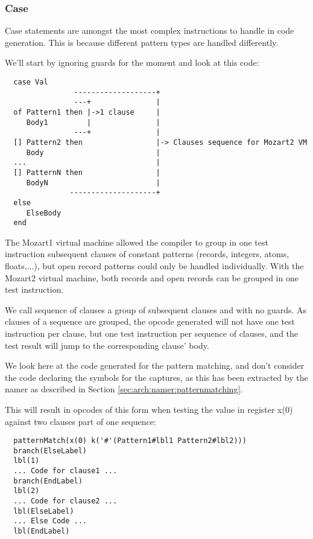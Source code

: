 \documentclass[a4paper]{memoir}
\begin{document}
\subsubsection{Case}\label{sec:arch:codegen:case}
Case statements are amongst the most complex instructions to handle in code generation. This is because different pattern types are handled differently. 


We'll start by ignoring guards for the moment and look at this code:

\begin{verbatim}
  case Val
                -------------------+
                ---+               |
  of Pattern1 then |->1 clause     |
     Body1         |               |
                ---+               |
  [] Pattern2 then                 |-> Clauses sequence for Mozart2 VM
     Body                          |
  ...                              |
  [] PatternN then                 |
     BodyN                         |
               --------------------+
  else
     ElseBody
  end

\end{verbatim}

The Mozart1 virtual machine allowed the compiler to group in one test instruction subsequent clauses of
constant patterns (records, integers, atoms, floats,...), but open
record patterns could only be handled individually.
With the Mozart2 virtual machine, both records and open records can be grouped in one test instruction.

We call sequence of clauses  a group of subsequent clauses and with no guards.
As clauses of a sequence are grouped, the opcode generated will not
have one test instruction per clause, but one test instruction
per sequence of clauses, and the test result will jump to the corresponding clause' body.

We look here at the code generated for the pattern matching, and don't consider
the code declaring the symbols for the captures, as this has been extracted by
the namer as described in Section \ref{sec:arch:namer:patternmatching}.

This will result in opcodes of this form when testing the value in register x(0) against two clauses part of one sequence:
\begin{lstlisting}
  patternMatch(x(0) k('#'(Pattern1#lbl1 Pattern2#lbl2)))
  branch(ElseLabel)
  lbl(1)
  ... Code for clause1 ...
  branch(EndLabel)
  lbl(2)
  ... Code for clause2 ...
  lbl(ElseLabel)
  ... Else Code ...
  lbl(EndLabel)
\end{lstlisting}
\end{document}
